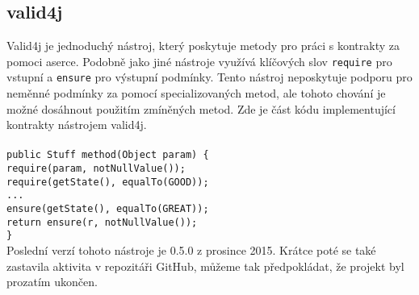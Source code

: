 		\subsection{valid4j}
			Valid4j \cite{valid4j} je jednoduchý nástroj, který poskytuje metody pro práci s kontrakty za pomoci aserce. Podobně jako jiné nástroje využívá klíčových slov \texttt{require} pro vstupní a \texttt{ensure} pro výstupní podmínky. Tento nástroj neposkytuje podporu pro neměnné podmínky za pomocí specializovaných metod, ale tohoto chování je možné dosáhnout použitím zmíněných metod. Zde je část kódu implementující kontrakty nástrojem valid4j.\\\\  
				\- \- \- \- \- \texttt{public Stuff method(Object param) \{}\\
				\- \- \- \- \- \- \- \- \- \- \texttt{require(param, notNullValue());}\\
				\- \- \- \- \- \- \- \- \- \- \texttt{require(getState(), equalTo(GOOD));}\\
				\- \- \- \- \- \- \- \- \- \- \texttt{...}\\
				\- \- \- \- \- \- \- \- \- \- \texttt{ensure(getState(), equalTo(GREAT));}\\
				\- \- \- \- \- \- \- \- \- \- \texttt{return ensure(r, notNullValue());}\\
				\- \- \- \- \- \texttt{\}}\\	
				
			Poslední verzí tohoto nástroje je 0.5.0 z prosince 2015. Krátce poté se také zastavila aktivita v repozitáři GitHub, můžeme tak předpokládat, že projekt byl prozatím ukončen.
	
		
